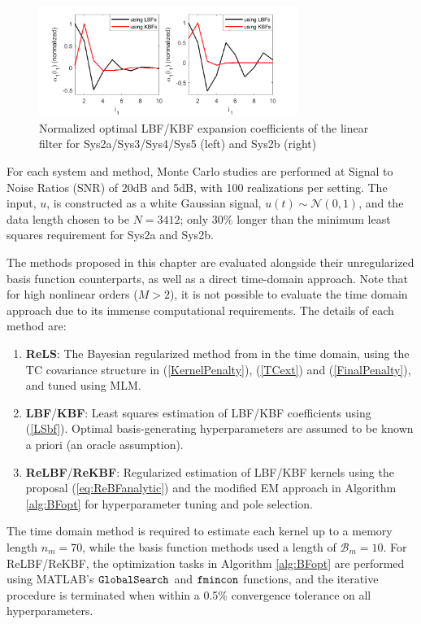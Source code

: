 \begin{figure}[!h]
\centering
\includegraphics[width = 0.75\textwidth]{Chapter5_RegBFs/Sys2a2b_alpha1.pdf}
\caption{Normalized optimal LBF/KBF expansion coefficients of the linear filter for Sys2a/Sys3/Sys4/Sys5 (left) and Sys2b (right)}
\label{fig:Sys2a2bBF}
\end{figure}

For each system and method, Monte Carlo studies are performed at Signal to Noise Ratios (SNR) of 20dB and 5dB, with 100 realizations per setting. The input, $u$, is constructed as a white Gaussian signal, $u(t) \sim \mathcal{N}(0,1)$, and the data length chosen to be $N=3412$; only 30\% longer than the minimum least squares requirement for Sys2a and Sys2b.

The methods proposed in this chapter are evaluated alongside their unregularized basis function counterparts, as well as a direct time-domain approach. Note that for high nonlinear orders ($M>2$), it is not possible to evaluate the time domain approach due to its immense computational requirements. The details of each method are:

\begin{enumerate}
\item \textbf{ReLS}: The Bayesian regularized method from \cite{Birpoutsoukis2017} in the time domain, using the TC covariance structure in (\ref{KernelPenalty}), (\ref{TCext}) and (\ref{FinalPenalty}), and tuned using MLM. 
\item \textbf{LBF}/\textbf{KBF}: Least squares estimation of LBF/KBF coefficients using (\ref{LSbf}). Optimal basis-generating hyperparameters are assumed to be known a priori (an oracle assumption).
\item \textbf{ReLBF}/\textbf{ReKBF}: Regularized estimation of LBF/KBF kernels using the proposal (\ref{eq:ReBFanalytic}) and the modified EM approach in Algorithm \ref{alg:BFopt} for hyperparameter tuning and pole selection. 
\end{enumerate}

The time domain method is required to estimate each kernel up to a memory length $n_m=70$, while the basis function methods used a length of $\mathcal{B}_m = 10$. For ReLBF/ReKBF, the optimization tasks in Algorithm \ref{alg:BFopt} are performed using MATLAB's $\text{\tt{GlobalSearch}}$ and $\text{\tt{fmincon}}$ functions, and the iterative procedure is terminated when within a 0.5\% convergence tolerance on all hyperparameters. 

